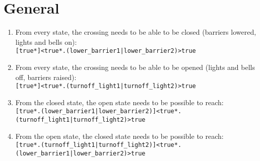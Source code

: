 \documentclass[final]{report}
\begin{document}
\section{General}
\label{sec:translated-requirements-general}

\begin{enumerate}
    \item From every state, the crossing needs to be able to be closed (barriers lowered, lights and bells on):\\
        \texttt{[true*]<true*.(lower\_barrier1|lower\_barrier2)>true}

    \item From every state, the crossing needs to be able to be opened (lights and bells off, barriers raised):\\
        \texttt{[true*]<true*.(turnoff\_light1|turnoff\_light2)>true}
        
     \item From the closed state, the open state needs to be possible to reach:\\    
     	\texttt{[true*.(lower\_barrier1|lower\_barrier2)]<true*.(turnoff\_light1|turnoff\_light2)>true}
     	
     \item From the open state, the closed state needs to be possible to reach:\\    
     \texttt{[true*.(turnoff\_light1|turnoff\_light2)]<true*.(lower\_barrier1|lower\_barrier2)>true}
\end{enumerate}
\end{document}
